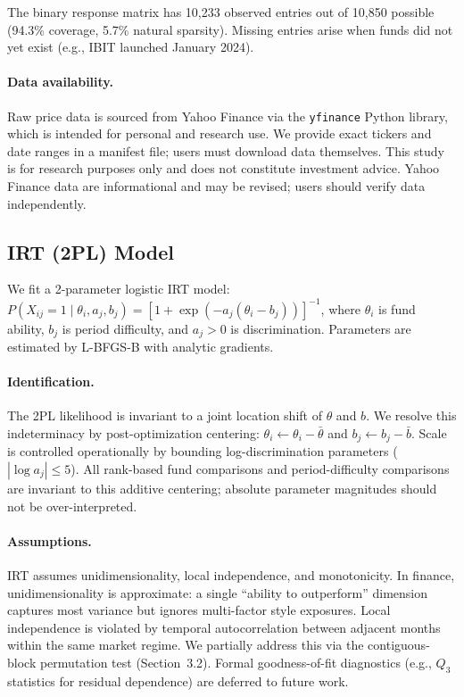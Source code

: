 \documentclass[11pt,a4paper]{article}
\begin{document}
The binary response matrix has 10,233 observed entries out of 10,850 possible (94.3\% coverage, 5.7\% natural sparsity). Missing entries arise when funds did not yet exist (e.g., IBIT launched January 2024).

\paragraph{Data availability.} Raw price data is sourced from Yahoo Finance via the \texttt{yfinance} Python library, which is intended for personal and research use. We provide exact tickers and date ranges in a manifest file; users must download data themselves. This study is for research purposes only and does not constitute investment advice. Yahoo Finance data are informational and may be revised; users should verify data independently.

\subsection{IRT (2PL) Model}

We fit a 2-parameter logistic IRT model:
$P(X_{ij}=1 \mid \theta_i, a_j, b_j) = [1+\exp(-a_j(\theta_i - b_j))]^{-1}$,
where $\theta_i$ is fund ability, $b_j$ is period difficulty, and $a_j > 0$ is discrimination. Parameters are estimated by L-BFGS-B with analytic gradients.

\paragraph{Identification.} The 2PL likelihood is invariant to a joint location shift of $\theta$ and $b$. We resolve this indeterminacy by post-optimization centering: $\theta_i \leftarrow \theta_i - \bar{\theta}$ and $b_j \leftarrow b_j - \bar{b}$. Scale is controlled operationally by bounding log-discrimination parameters ($|\log a_j| \leq 5$). All rank-based fund comparisons and period-difficulty comparisons are invariant to this additive centering; absolute parameter magnitudes should not be over-interpreted.

\paragraph{Assumptions.} IRT assumes unidimensionality, local independence, and monotonicity. In finance, unidimensionality is approximate: a single ``ability to outperform'' dimension captures most variance but ignores multi-factor style exposures. Local independence is violated by temporal autocorrelation between adjacent months within the same market regime. We partially address this via the contiguous-block permutation test (Section~3.2). Formal goodness-of-fit diagnostics (e.g., $Q_3$ statistics for residual dependence) are deferred to future work.
\end{document}
